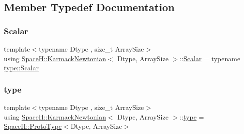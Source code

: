 \subsection{Member Typedef Documentation}
\mbox{\label{struct_space_h_1_1_karmack_newtonian_ae3b4407bf4803cf861b7bdf0d117c4bb}} 
\subsubsection{\texorpdfstring{Scalar}{Scalar}}
{\footnotesize\ttfamily template$<$typename Dtype , size\+\_\+t Array\+Size$>$ \\
using \mbox{\hyperlink{struct_space_h_1_1_karmack_newtonian}{Space\+H\+::\+Karmack\+Newtonian}}$<$ Dtype, Array\+Size $>$\+::\mbox{\hyperlink{struct_space_h_1_1_karmack_newtonian_ae3b4407bf4803cf861b7bdf0d117c4bb}{Scalar}} =  typename \mbox{\hyperlink{struct_space_h_1_1_proto_type_af3c8245d83d9db64749882920de5c274}{type\+::\+Scalar}}}

\mbox{\label{struct_space_h_1_1_karmack_newtonian_a1e7865ad1ed3b6f158f83af6575db27d}} 
\subsubsection{\texorpdfstring{type}{type}}
{\footnotesize\ttfamily template$<$typename Dtype , size\+\_\+t Array\+Size$>$ \\
using \mbox{\hyperlink{struct_space_h_1_1_karmack_newtonian}{Space\+H\+::\+Karmack\+Newtonian}}$<$ Dtype, Array\+Size $>$\+::\mbox{\hyperlink{struct_space_h_1_1_karmack_newtonian_a1e7865ad1ed3b6f158f83af6575db27d}{type}} =  \mbox{\hyperlink{struct_space_h_1_1_proto_type}{Space\+H\+::\+Proto\+Type}}$<$Dtype, Array\+Size$>$}

\mbox{\label{struct_space_h_1_1_karmack_newtonian_a7c009d5759bb0bb17376432619394e4f}} 
